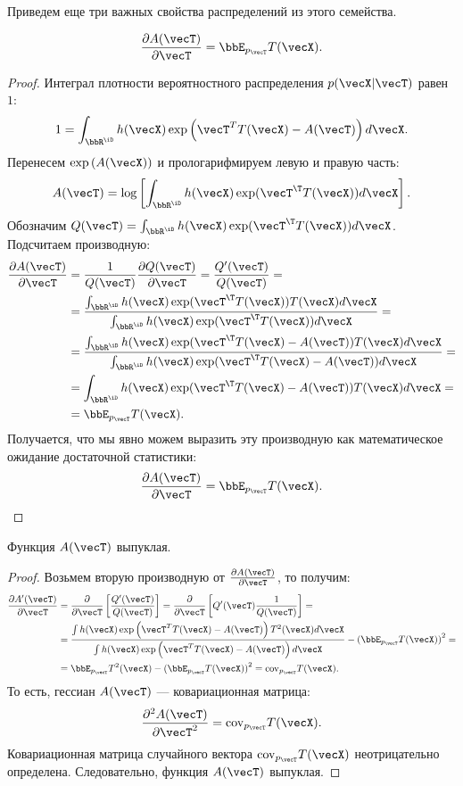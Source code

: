 Приведем еще три важных свойства распределений из этого семейства.
\begin{Theorem}
\label{th:exponential_derivative}
\begin{equation}
\label{eq:a_derivative}
\frac{\partial A(\vecT)}{\partial \vecT} = \bbE_{p_{\vecT}} T(\vecX).
\end{equation}
\end{Theorem}
\begin{proof}
Интеграл плотности вероятностного распределения $p(\vecX| \vecT)$ равен $1$:
\[
1 = \int_{\bbR^{\iD}} h(\vecX) \exp \left(\vecT^T T(\vecX) - A(\vecT) \right) d\vecX.
\]
Перенесем $\exp \left(A(\vecX) \right)$ и прологарифмируем левую и правую часть:
\[
A(\vecT) = \log \left[\int_{\bbR^{\iD}} h(\vecX) \exp( \vecT^\T T(\vecX)) d \vecX \right].
\]
Обозначим $Q(\vecT) = \int_{\bbR^{\iD}} h(\vecX) \exp( \vecT^\T T(\vecX)) d \vecX$.
Подсчитаем производную:
\begin{align*}
\frac{\partial A(\vecT)}{\partial \vecT} &= \frac{1}{Q(\vecT)} \frac{\partial Q(\vecT)}{\partial \vecT} = \frac{Q'(\vecT)}{Q(\vecT)} = \\
&= \frac{\int_{\bbR^{\iD}} h(\vecX) \exp( \vecT^\T T(\vecX)) T(\vecX) d \vecX}{\int_{\bbR^{\iD}} h(\vecX) \exp( \vecT^\T T(\vecX)) d \vecX} = \\
&= \frac{\int_{\bbR^{\iD}} h(\vecX) \exp( \vecT^\T T(\vecX) - A(\vecT)) T(\vecX) d \vecX}{\int_{\bbR^{\iD}} h(\vecX) \exp( \vecT^\T T(\vecX) - A(\vecT)) d \vecX} = \\
&= \int_{\bbR^{\iD}} h(\vecX) \exp( \vecT^\T T(\vecX) - A(\vecT)) T(\vecX) d \vecX = \\
&= \bbE_{p_{\vecT}} T(\vecX).
\end{align*}
Получается, что мы явно можем выразить эту производную как математическое ожидание достаточной статистики:
\[
\frac{\partial A(\vecT)}{\partial \vecT} = \bbE_{p_{\vecT}} T(\vecX).
\]
\end{proof}
\begin{Theorem}
Функция $A(\vecT)$ выпуклая.
\end{Theorem}
\begin{proof}
Возьмем вторую производную от $\frac{\partial A(\vecT)}{\partial \vecT}$, то получим:
\begin{align*}
\frac{\partial A'(\vecT)}{\partial \vecT} &= \frac{\partial }{\partial \vecT} \left[\frac{Q'(\vecT)}{Q(\vecT)} \right] = \frac{\partial }{\partial \vecT} \left[ Q'(\vecT) \frac{1}{Q(\vecT)} \right] = \\
&=  \frac{\int h(\vecX) \exp \left(\vecT^T T(\vecX)  - A(\vecT)\right) T^2(\vecX) d \vecX}{\int h(\vecX) \exp \left(\vecT^T T(\vecX)  - A(\vecT)\right) d \vecX} - \left(\bbE_{p_{\vecT}} T(\vecX) \right)^2 = \\
&= \bbE_{p_{\vecT}} T^2(\vecX) - \left(\bbE_{p_{\vecT}} T(\vecX) \right)^2 = \mathrm{cov}_{p_{\vecT}} T(\vecX).
\end{align*}
То есть, гессиан $A(\vecT)$ --- ковариационная матрица:
\[
\frac{\partial^2 A(\vecT)}{\partial \vecT^2} = \mathrm{cov}_{p_{\vecT}} T(\vecX).
\]
Ковариационная матрица случайного вектора $\mathrm{cov}_{p_{\vecT}} T(\vecX)$ неотрицательно определена.
Следовательно, функция $A(\vecT)$ выпуклая.
\end{proof}


